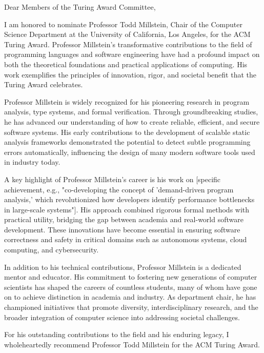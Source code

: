 Dear Members of the Turing Award Committee,

I am honored to nominate Professor Todd Millstein, Chair of the Computer Science Department at the University of California, Los Angeles, for the ACM Turing Award. Professor Millstein’s transformative contributions to the field of programming languages and software engineering have had a profound impact on both the theoretical foundations and practical applications of computing. His work exemplifies the principles of innovation, rigor, and societal benefit that the Turing Award celebrates.

Professor Millstein is widely recognized for his pioneering research in program analysis, type systems, and formal verification. Through groundbreaking studies, he has advanced our understanding of how to create reliable, efficient, and secure software systems. His early contributions to the development of scalable static analysis frameworks demonstrated the potential to detect subtle programming errors automatically, influencing the design of many modern software tools used in industry today.

A key highlight of Professor Millstein’s career is his work on [specific achievement, e.g., "co-developing the concept of 'demand-driven program analysis,' which revolutionized how developers identify performance bottlenecks in large-scale systems"]. His approach combined rigorous formal methods with practical utility, bridging the gap between academia and real-world software development. These innovations have become essential in ensuring software correctness and safety in critical domains such as autonomous systems, cloud computing, and cybersecurity.

In addition to his technical contributions, Professor Millstein is a dedicated mentor and educator. His commitment to fostering new generations of computer scientists has shaped the careers of countless students, many of whom have gone on to achieve distinction in academia and industry. As department chair, he has championed initiatives that promote diversity, interdisciplinary research, and the broader integration of computer science into addressing societal challenges.

For his outstanding contributions to the field and his enduring legacy, I wholeheartedly recommend Professor Todd Millstein for the ACM Turing Award. 